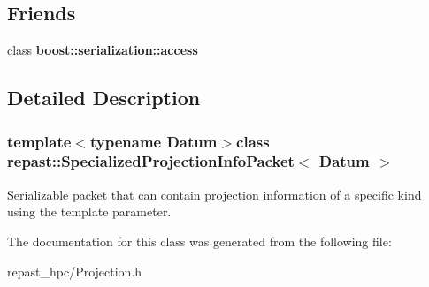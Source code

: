 \subsection*{Friends}
\begin{DoxyCompactItemize}
\item 
\hypertarget{classrepast_1_1_specialized_projection_info_packet_ac98d07dd8f7b70e16ccb9a01abf56b9c}{class {\bfseries boost\-::serialization\-::access}}\label{classrepast_1_1_specialized_projection_info_packet_ac98d07dd8f7b70e16ccb9a01abf56b9c}

\end{DoxyCompactItemize}


\subsection{Detailed Description}
\subsubsection*{template$<$typename Datum$>$class repast\-::\-Specialized\-Projection\-Info\-Packet$<$ Datum $>$}

Serializable packet that can contain projection information of a specific kind using the template parameter. 

The documentation for this class was generated from the following file\-:\begin{DoxyCompactItemize}
\item 
repast\-\_\-hpc/Projection.\-h\end{DoxyCompactItemize}
